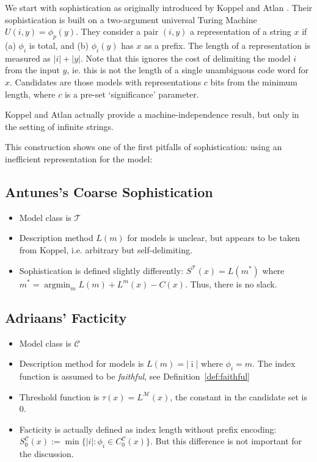 \documentclass{style/llncs}
\newcommand{\M}{\mathscr M}
\newcommand{\C}{\mathscr C}
\newcommand{\T}{\mathscr T}
\newcommand{\argmin}{\mathop{\arg\min}}
\begin{document}
We start with sophistication as originally introduced by Koppel and Atlan \cite{koppelSoph1988,koppel1991almost}. Their sophistication is built on a two-argument universal Turing Machine $U(i, y) = \phi_p(y)$. They consider a pair $(i, y)$ a representation of a string $x$ if (a) $\phi_i$ is total, and (b) $\phi_i(y)$ has $x$ as a prefix. The length of a representation is measured as $|i| + |y|$. Note that this ignores the cost of delimiting the model $i$ from the input $y$, ie. this is not the length of a single unambiguous code word for $x$. Candidates are those models with representations $c$ bits from the minimum length, where $c$ is a pre-set `significance' parameter. 

\footnotemark 

Koppel and Atlan actually provide a machine-independence result, but only in the setting of infinite strings. 


This construction shows one of the first pitfalls of sophistication: using an inefficient representation for the model:


\subsection{Antunes's Coarse Sophistication}

\begin{itemize}
\item Model class is $\T$
\item Description method $L(m)$ for models is unclear, but appears to be
  taken from Koppel, i.e. arbitrary but self-delimiting.
\item Sophistication is defined slightly differently: $S^\T(x)=L(m^*)$ where $m^*=\argmin_m L(m)+L^m(x)-C(x)$. Thus, there is no slack.
\end{itemize}


\subsection{Adriaans' Facticity}

\begin{itemize}
\item Model class is $\C$
\item Description method for models is $L(m)=|\bar\imath|$ where
  $\phi_i=m$. The index function is assumed to be \emph{faithful}, see
  Definition~\ref{def:faithful}
\item Threshold function is $\tau(x)=L^\M(x)$, the constant in the candidate set is $0$.
\item Facticity is actually defined as index length without prefix
  encoding:  $S^\C_0(x):=\min\{|i|:\phi_i\in C^\C_0(x)\}$. But this
  difference is not important for the discussion.
\end{itemize}
\end{document}
